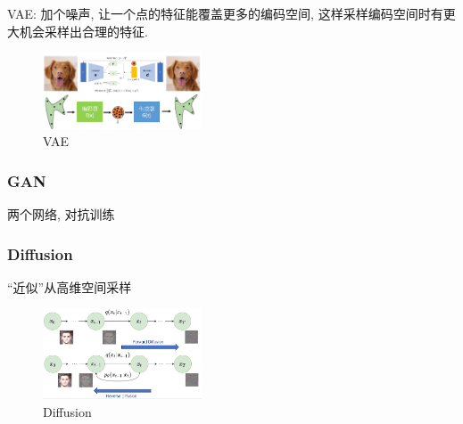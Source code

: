 VAE: 加个噪声, 让一个点的特征能覆盖更多的编码空间, 这样采样编码空间时有更大机会采样出合理的特征. 

\begin{figure}[!htb]
    \centering
    \includegraphics[width=0.42\textwidth]{pic/DL3/VAE}
    \caption{VAE}
\end{figure}

\subsubsection{GAN}
两个网络, 对抗训练

\subsubsection{Diffusion}
``近似''从高维空间采样
\begin{figure}[!htb]
    \centering
    \includegraphics[width=0.42\textwidth]{pic/DL3/Diffusion}
    \caption{Diffusion}
\end{figure}

